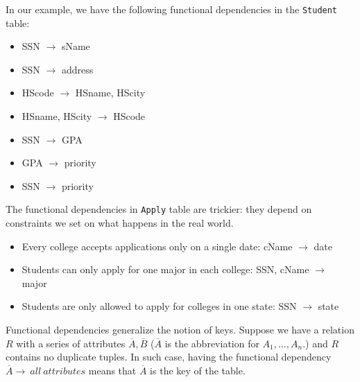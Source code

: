 In our example, we have the following functional dependencies in the \texttt{Student} table:
\begin{itemize}
\item SSN $\rightarrow$ sName
\item SSN $\rightarrow$ address
\item HScode $\rightarrow$ HSname, HScity
\item HSname, HScity $\rightarrow$ HScode
\item SSN $\rightarrow$ GPA
\item GPA $\rightarrow$ priority
\item SSN $\rightarrow$ priority
\end{itemize}
The functional dependencies in \texttt{Apply} table are trickier: they depend on constraints we set on what happens in the real world.
\begin{itemize}
\item Every college accepts applications only on a single date: cName $\rightarrow$ date
\item Students can only apply for one major in each college: SSN, cName $\rightarrow$ major
\item Students are only allowed to apply for colleges in one state: SSN $\rightarrow$ state
\end{itemize}

Functional dependencies generalize the notion of keys. Suppose we have a relation $R$ with a series of attributes ${\overline{A},\overline{B}}$ ($\overline{{A}}$ is the abbreviation for ${A_1,\dots,A_n}$.) and $R$ contains no duplicate tuples. In such case, having the functional dependency ${\overline{A}\rightarrow\:all\:attributes}$ means that ${\overline{A}}$ is the key of the table.

